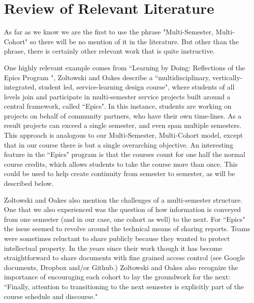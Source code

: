 \section{Review of Relevant Literature}

As far as we know we are the first to use the phrase "Multi-Semester, Multi-Cohort" so there will be no mention of it in the literature. But other than the phrase, there is certainly other relevant work that is quite instructive. 

One highly relevant example comes from ``Learning by Doing: Reflections of the Epics Program \cite{Epics}", Zoltowski and Oakes describe a ``multidisciplinary, vertically-integrated, student led, service-learning design course", where students of all levels join and participate in multi-semester service projects built around a central framework, called ``Epics". In this instance, students are working on projects on behalf of community partners, who have their own time-lines. As a result projects can exceed a single semester, and even span multiple semesters. This approach is analogous to our Multi-Semester, Multi-Cohort model, except that in our course there is but a single overarching objective. An interesting feature in the ``Epics" program is that the courses count for one half the normal course credits, which allows students to take the course more than once. This could be used to help create continuity from semester to semester, as will be described below. 

Zoltowski and Oakes also mention the challenges of a multi-semester structure. One that we also experienced was the question of how information is conveyed from one semester (and in our case, one cohort as well) to the next. For ``Epics" the issue seemed to revolve around the technical means of sharing reports. Teams were sometimes reluctant to share publicly because they wanted to protect intellectual property. In the years since their work though it has become straightforward to share documents with fine grained access control (see Google documents, Dropbox and/or Github.) Zoltowski and Oakes also recognize the importance of encouraging each cohort to lay the groundwork for the next: ``Finally, attention to transitioning to the next semester is explicitly part of the course schedule and discourse."

